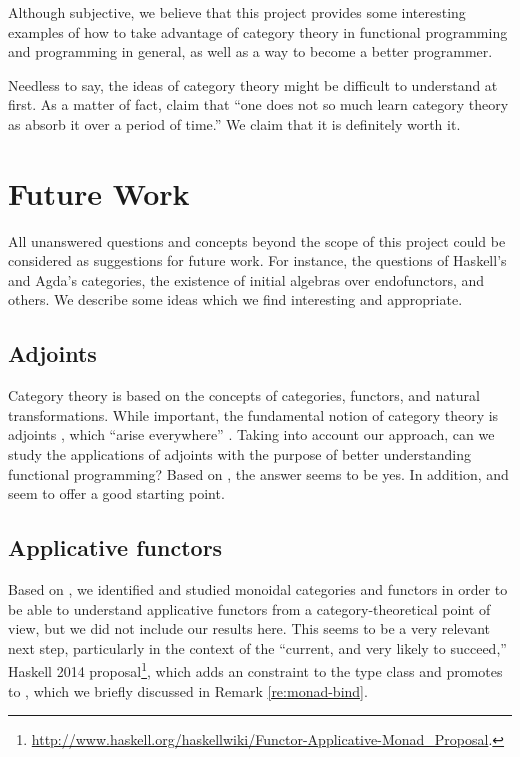 Although subjective, we believe that this project provides some
interesting examples of how to take advantage of category theory in
functional programming and programming in general, as well as a way to
become a better programmer.

Needless to say, the ideas of category theory might be difficult to
understand at first. As a matter of fact,
\textcite[25]{bird-demoor-1997} claim that ``one does not so much
learn category theory as absorb it over a period of time.'' We claim
that it is definitely worth it.

\section{Future Work}
\label{sec:future}

All unanswered questions and concepts beyond the scope of this project
could be considered as suggestions for future work. For instance, the
questions of Haskell's and Agda's categories, the existence of initial
algebras over endofunctors, and others. We describe some ideas which
we find interesting and appropriate.

\subsection{Adjoints}
\label{sec:future-adjoints}

Category theory is based on the concepts of categories, functors, and
natural transformations. While important, the fundamental notion of
category theory is adjoints \parencite[11]{marquis-2013}, which
``arise everywhere'' \parencite[vii]{maclane-1998}. Taking into
account our approach, can we study the applications of adjoints with
the purpose of better understanding functional programming? Based on
\parencites[§ 13]{barr-wells-2012}[79--81]{elkins-2009}[§
  2.4]{pierce-1991}{rydeheard-1986-adjunctions}[§
  6]{rydeheard-burstall-1988}, the answer seems to be yes. In
addition, \textcite[§ 9]{awodey-2010} and \textcite[§
  IV]{maclane-1998} seem to offer a good starting point.

\subsection{Applicative functors}
\label{sec:future-monoidals}

Based on \parencite{mcbride-paterson-2008}, we identified and studied
monoidal categories and functors in order to be able to understand
applicative functors from a category-theoretical point of view, but we
did not include our results here. This seems to be a very relevant
next step, particularly in the context of the ``current, and very
likely to succeed,'' Haskell 2014 
proposal\footnote{\url{http://www.haskell.org/haskellwiki/Functor-Applicative-Monad_Proposal}.},
which adds an  constraint to the
 type class and promotes  to
, which we briefly discussed in Remark
\ref{re:monad-bind}.

